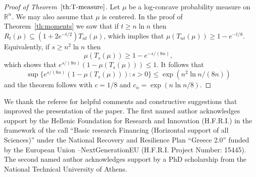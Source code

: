\documentclass[11pt,leqno]{article}
\theoremstyle{definition}
\theoremstyle{remark}
\numberwithin{equation}{section}
\newcommand{\ls}{\leqslant}
\newcommand{\gr}{\geqslant}
\newcommand{\1}{\textbf{1}}
\begin{document}
\begin{proof}[Proof of Theorem~$\ref{th:T-measure}$]Let $\mu$ be a log-concave probability measure on $\mathbb{R}^n$.
We may also assume that $\mu$ is centered. In the proof of Theorem~\ref{th:moments} we saw that if $t\gr n\ln n$ then
$R_t(\mu)\subseteq (1+2e^{-t/2})T_{nt}(\mu)$, which implies that $\mu(T_{nt}(\mu))\gr 1-e^{-t/8}$. Equivalently, if $s\gr n^2\ln n$ then
$$\mu(T_s(\mu))\gr  1-e^{-s/(8n)},$$
which shows that $e^{s/(8n)}(1-\mu(T_s(\mu)))\ls 1$. It follows that
$$\sup\{e^{s/(8n)}(1-\mu(T_s(\mu))):s>0\}\ls \exp(n^2\ln n/(8n))$$
and the theorem follows with $c=1/8$ and $c_n=\exp(n\ln n/8)$.
\end{proof}



\bigskip

 We thank the referee for helpful comments and constructive suggestions that improved the presentation of the paper. 
The first named author acknowledges support by the Hellenic Foundation for
Research and Innovation (H.F.R.I.) in the framework of the call ``Basic research Financing (Horizontal support of all Sciences)” 
under the National Recovery and Resilience Plan ``Greece 2.0” funded by the European Union –NextGenerationEU (H.F.R.I. Project Number: 15445).
The second named author acknowledges support by a PhD scholarship from the National Technical University of Athens.

\bigskip

\end{document}
